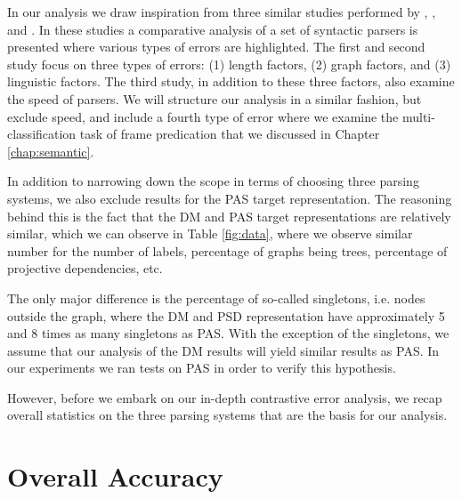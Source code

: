 
In our analysis we draw inspiration from three similar studies performed by , , and . In these studies a comparative analysis of a set of syntactic parsers is presented where various types of errors are highlighted. The first and second study focus on three types of errors: (1) length factors, (2) graph factors, and (3) linguistic factors. The third study, in addition to these three factors, also examine the speed of parsers. We will structure our analysis in a similar fashion, but exclude speed, and include a fourth type of error where we examine the multi-classification task of frame predication that we discussed in Chapter \ref{chap:semantic}.

In addition to narrowing down the scope in terms of choosing three parsing systems, we also exclude results for the PAS target representation. The reasoning behind this is the fact that the DM and PAS target representations are relatively similar, which we can observe in Table \ref{fig:data}, where we observe similar number for the number of labels, percentage of graphs being trees, percentage of projective dependencies, etc. 

The only major difference is the percentage of so-called singletons, i.e. nodes outside the graph, where the DM and PSD representation have approximately 5 and 8 times as many singletons as PAS. With the exception of the singletons, we assume that our analysis of the DM results will yield similar results as PAS. In our experiments we ran tests on PAS in order to verify this hypothesis.

However, before we embark on our in-depth contrastive error analysis, we recap overall statistics on the three parsing systems that are the basis for our analysis.

\section{Overall Accuracy}

